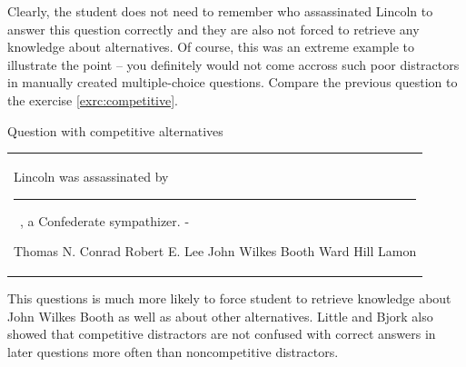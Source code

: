 \documentclass[a4paper, 12pt, twoside]{fithesis2}		%
\renewcommand{\_}{\leavevmode \kern0.07em\vbox{\hrule width0.4em}}
\newcounter{choice}
\renewcommand\thechoice{\Alph{choice}}
\newcommand\choicelabel{\thechoice.}
\newenvironment{choices}%
  {\vspace{0.8em}\list{\choicelabel}%
     {\usecounter{choice}\def\makelabel##1{\hss\llap{##1}}%
       \settowidth{\leftmargin}{W.\hskip\labelsep\hskip 0.01em}%
       \def\choice{%
         \item
       } %
       \labelwidth\leftmargin\advance\labelwidth-\labelsep
       \topsep=0pt
       \partopsep=0pt
     }%
  }%
  {\vspace{-0.7em}\endlist}
\newenvironment{question}
{
  \begin{center}
  \vspace{-0.5em}
  \begin{tabular}{p{0.9\textwidth}}
}
{
  \\
  \end{tabular}
  \vspace{-1em}
  \end{center}
}
\newcommand{\sentenceGap}{\rule{1.5cm}{0.4pt}~}
\begin{document}
\noindent
Clearly, the student does not need to remember who assassinated Lincoln to answer this question correctly and they are also not forced to retrieve any knowledge about alternatives.
Of course, this was an extreme example to illustrate the point -- you definitely would not come accross such poor distractors in manually created multiple-choice questions.
Compare the previous question to the exercise \ref{exrc:competitive}.
\begin{exercise}
\caption{Question with competitive alternatives}\label{exrc:competitive}
  \begin{question}
  Lincoln was assassinated by \sentenceGap , a Confederate sympathizer.
  \begin{choices}
    \choice Thomas N. Conrad
    \choice Robert E. Lee
    \choice John Wilkes Booth
    \choice Ward Hill Lamon
  \end{choices}
  \end{question}
\end{exercise}

\noindent
This questions is much more likely to force student to retrieve knowledge about John Wilkes Booth as well as about other alternatives.
Little and Bjork also showed that competitive distractors are not confused with correct answers in later questions more often than noncompetitive distractors.
\end{document}
